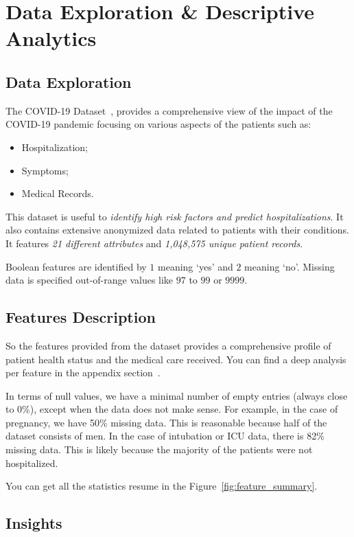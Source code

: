 \section{Data Exploration \& Descriptive Analytics}

\subsection{Data Exploration}

The COVID-19 Dataset~\parencite[]{2023:NizMei}, provides a comprehensive view of the impact
of the COVID-19 pandemic focusing on various aspects of the patients such as:
\begin{itemize}
    \item Hospitalization;
    \item Symptoms;
    \item Medical Records.
\end{itemize}
This dataset is useful to \emph{identify high risk factors and predict hospitalizations}.
It also contains extensive anonymized data related to patients with their conditions. It features
\emph{21 different attributes} and \emph{1,048,575 unique patient records}.

Boolean features are identified by $1$ meaning `yes' and $2$ meaning `no'. Missing data is specified
out-of-range values like $97$ to $99$ or $9999$.

\subsection{Features Description}

So the features provided from the dataset provides a comprehensive profile of 
patient health status and the medical care received. You can find a deep analysis per feature
in the appendix section~.

In terms of null values, we have a minimal number of empty entries (always close to 0\%), except 
when the data does not make sense. For example, in the case of pregnancy, we have 50\% missing 
data. This is reasonable because half of the dataset consists of men. In the case of intubation 
or ICU data, there is 82\% missing data. This is likely because the majority of the patients
were not hospitalized.

You can get all the statistics resume in the Figure~\ref{fig:feature_summary}.

\subsection{Insights}

